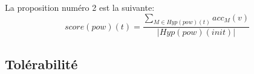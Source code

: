 \documentclass{llncs}
\begin{document}
	La proposition numéro 2 est la suivante:
	$$score(pow)(t) = \frac{\sum_{M\in Hyp(pow)(t)} acc_M(v)}{|Hyp(pow)(init)|}$$


	\subsection{Tolérabilité}
	
	
	
\end{document}
